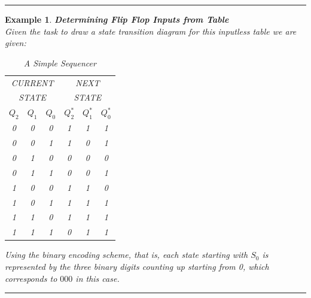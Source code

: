 \documentclass[12pt]{article}
\newtheorem{example}{Example}
\newenvironment{examp}
{
	\vspace{.5cm}
	\hrule
\begin{example}\upshape}
	{\hrule
		\vspace{0.5cm}
\end{example}}
\begin{document}
\begin{examp}
\vspace{.5mm}
\textbf{Determining Flip Flop Inputs from Table}\\
Given the task to draw a state transition diagram for this inputless table we
are given:
\begin{table}[H]
	\centering
	\begin{tabular}{|c|c|c|c|c|c|}
		\hline
		\multicolumn{3}{|c|}{CURRENT} & \multicolumn{3}{c|}{NEXT}                                                \\
		\multicolumn{3}{|c|}{STATE}   & \multicolumn{3}{c|}{STATE}                                               \\
		\hline
		\(Q_2\)                       & \(Q_1\)                    & \(Q_0\) & \(Q_2^*\) & \(Q_1^*\) & \(Q_0^*\) \\
		\hline
		0                             & 0                          & 0       & 1         & 1         & 1         \\
		0                             & 0                          & 1       & 1         & 0         & 1         \\
		0                             & 1                          & 0       & 0         & 0         & 0         \\
		0                             & 1                          & 1       & 0         & 0         & 1         \\
		1                             & 0                          & 0       & 1         & 1         & 0         \\
		1                             & 0                          & 1       & 1         & 1         & 1         \\
		1                             & 1                          & 0       & 1         & 1         & 1         \\
		1                             & 1                          & 1       & 0         & 1         & 1         \\
		\hline
	\end{tabular}
	\caption{A Simple Sequencer}
\end{table}
Using the binary encoding scheme, that is, each state starting with \(S_0\) is
represented by the three binary digits counting up starting from 0, which
corresponds to \(000\) in this case.	


\end{examp}
\end{document}
